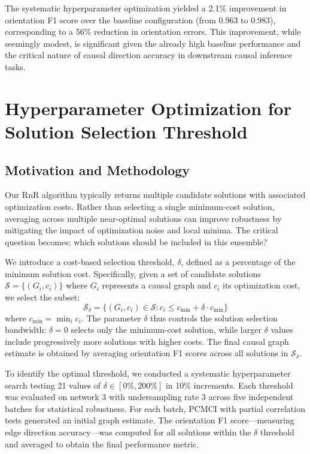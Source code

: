 The systematic hyperparameter optimization yielded a 2.1\% improvement in orientation F1 score over the baseline configuration (from 0.963 to 0.983), corresponding to a 56\% reduction in orientation errors. This improvement, while seemingly modest, is significant given the already high baseline performance and the critical nature of causal direction accuracy in downstream causal inference tasks.


\section{Hyperparameter Optimization for Solution Selection Threshold}
\label{sec:delta_optimization}

\subsection{Motivation and Methodology}

Our RnR algorithm typically returns multiple candidate solutions with associated optimization costs. Rather than selecting a single minimum-cost solution, averaging across multiple near-optimal solutions can improve robustness by mitigating the impact of optimization noise and local minima. The critical question becomes: which solutions should be included in this ensemble?

We introduce a cost-based selection threshold, $\delta$, defined as a percentage of the minimum solution cost. Specifically, given a set of candidate solutions $\mathcal{S} = \{(G_i, c_i)\}$ where $G_i$ represents a causal graph and $c_i$ its optimization cost, we select the subset:
\[
\mathcal{S}_\delta = \{(G_i, c_i) \in \mathcal{S} : c_i \leq c_{\text{min}} + \delta \cdot c_{\text{min}}\}
\]
where $c_{\text{min}} = \min_i c_i$. The parameter $\delta$ thus controls the solution selection bandwidth: $\delta = 0$ selects only the minimum-cost solution, while larger $\delta$ values include progressively more solutions with higher costs. The final causal graph estimate is obtained by averaging orientation F1 scores across all solutions in $\mathcal{S}_\delta$.

To identify the optimal threshold, we conducted a systematic hyperparameter search testing 21 values of $\delta \in [0\%, 200\%]$ in 10\% increments. Each threshold was evaluated on network 3 with undersampling rate 3 across five independent batches for statistical robustness. For each batch, PCMCI with partial correlation tests generated an initial graph estimate. The orientation F1 score---measuring edge direction accuracy---was computed for all solutions within the $\delta$ threshold and averaged to obtain the final performance metric.

